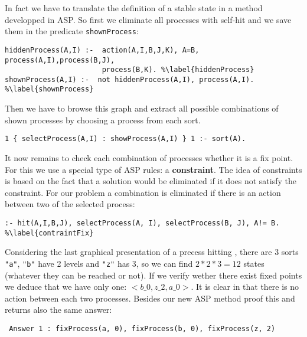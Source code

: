 In fact we have to translate the definition of a stable state in a method developped in ASP. So first we eliminate all processes with self-hit and we save them in the predicate \texttt{shownProcess}:
\begin{lstlisting}
hiddenProcess(A,I) :-  action(A,I,B,J,K), A=B, process(A,I),process(B,J),
                       process(B,K). %\label{hiddenProcess}
shownProcess(A,I) :-  not hiddenProcess(A,I), process(A,I). %\label{shownProcess}
\end{lstlisting}
Then we have to browse this graph and extract all possible combinations of shown processes by choosing a process from each sort.
\begin{lstlisting}
1 { selectProcess(A,I) : showProcess(A,I) } 1 :- sort(A).
\end{lstlisting}
It now remains to check each combination of processes whether it is a fix point. For this we use a special type of ASP rules: a \textbf{constraint}. The idea of constraints is based on the fact that a solution would be eliminated if it does not satisfy the constraint. For our problem a combination is eliminated if there is an action between two of the selected process:
\begin{lstlisting}
:- hit(A,I,B,J), selectProcess(A, I), selectProcess(B, J), A!= B. %\label{contraintFix}
\end{lstlisting}

\begin{example}
Considering the last graphical presentation of a precess hitting , there are 3 sorts \texttt{"a"}, \texttt{"b"} have 2 levels and \texttt{"z"} has 3, so we can find $2*2*3 = 12$ states (whatever they can be reached or not). If we verify wether there exist fixed points we deduce that we have only one: $<b\_0, z\_2, a\_0>$. It is clear in  that there is no action between each two processes. Besides our new ASP method proof this and returns also the same answer:
\begin{tabbing}
 \texttt{
 Answer 1 : fixProcess(a, 0), fixProcess(b, 0), fixProcess(z, 2)
 }
\end{tabbing}
\end{example}